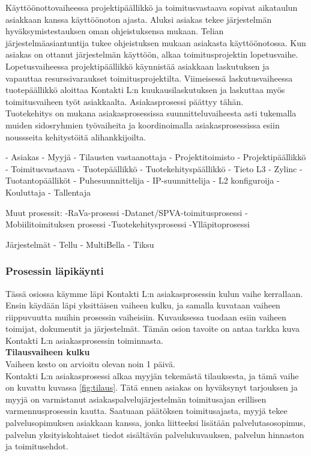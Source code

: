 \documentclass[finnish,12pt,a4paper,pdftex]{article}
\begin{document}
Käyttöönottovaiheessa projektipäällikkö ja toimitusvastaava sopivat aikataulun asiakkaan kanssa käyttöönoton ajasta. Aluksi asiakas tekee järjestelmän hyväksymistestauksen oman ohjeistuksensa mukaan. Telian järjestelmäasiantuntija tukee ohjeistuksen mukaan asiakasta käyttöönotossa. Kun asiakas on ottanut järjestelmän käyttöön, alkaa toimitusprojektin lopetusvaihe.\\

Lopetusvaiheessa projektipäällikkö käynnistää asiakkaan laskutuksen ja vapauttaa resurssivaraukset toimitusprojektilta. Viimeisessä laskutusvaiheessa tuotepäällikkö aloittaa Kontakti L:n kuukausilaskutuksen ja laskuttaa myös toimitusvaiheen työt asiakkaalta. Asiakasprosessi päättyy tähän.\\

Tuotekehitys on mukana asiakasprosessissa suunnitteluvaiheesta asti tukemalla muiden sidosryhmien työvaiheita ja koordinoimalla asiakasprosessissa esiin noussseita kehitystöitä alihankkijoilta.

 

- Asiakas
- Myyjä
- Tilausten vastaanottaja
- Projektitoimisto
- Projektipäällikkö
- Toimitusvastaava
- Tuotepäällikkö
- Tuotekehityspäällikkö
- Tieto L3
- Zylinc
- Tuotantopäälliköt
- Puhesuunnittelija
- IP-suunnittelija
- L2 konfiguroija
- Kouluttaja
- Tallentaja

Muut prosessit:
-RaVa-prosessi
-Datanet/SPVA-toimitusprosessi
-Mobiilitoimituksen prosessi
-Tuotekehitysprosessi
-Ylläpitoprosessi

Järjestelmät
- Tellu
- MultiBella
- Tiksu
\subsubsection{Prosessin läpikäynti}

Tässä osiossa käymme läpi Kontakti L:n asiakasprosessin kulun vaihe kerrallaan. Ensin käydään läpi yksittäisen vaiheen kulku, ja samalla kuvataan vaiheen riippuvuutta muihin prosessin vaiheisiin. Kuvauksessa tuodaan esiin vaiheen toimijat, dokumentit ja järjestelmät. Tämän osion tavoite on antaa tarkka kuva Kontakti L:n asiakasprosessin toiminnasta.\\

\textbf{Tilausvaiheen kulku}\\

Vaiheen kesto on arvioitu olevan noin 1 päivä.\\

Kontakti L:n asiakasprosessi alkaa myyjän tekemästä tilauksesta, ja tämä vaihe on kuvattu kuvassa \ref{fig:tilaus}. Tätä ennen asiakas on hyväksynyt tarjouksen ja myyjä on varmistanut asiakaspalvelujärjestelmän toimitusajan erillisen varmennusprosessin kautta. Saatuaan päätöksen toimitusajasta, myyjä tekee palvelusopimuksen asiakkaan kanssa, jonka liitteeksi lisätään palvelutasosopimus, palvelun yksityiskohtaiset tiedot sisältävän palvelukuvauksen, palvelun hinnaston ja toimitusehdot.
\end{document}
